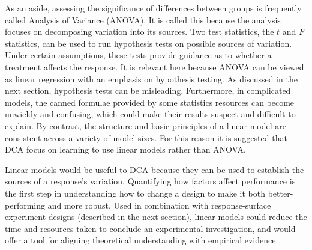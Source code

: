\documentclass[11pt,a4paper,article]{memoir} %
\begin{document}
As an aside, assessing the significance of differences between groups is frequently called Analysis of Variance (ANOVA). It is called this because the analysis focuses on decomposing variation into its sources. Two test statistics, the $t$ and $F$ statistics, can be used to run hypothesis tests on possible sources of variation. Under certain assumptions, these tests provide guidance as to whether a treatment affects the response. It is relevant here because ANOVA can be viewed as linear regression with an emphasis on hypothesis testing. As discussed in the next section, hypothesis tests can be misleading. Furthermore, in complicated models, the canned formulae provided by some statistics resources can become unwieldy and confusing, which could make their results suspect and difficult to explain. By contrast, the structure and basic principles of a linear model are consistent across a variety of model sizes. For this reason it is suggested that DCA focus on learning to use linear models rather than ANOVA.

Linear models would be useful to DCA because they can be used to establish the sources of a response's variation. Quantifying how factors affect performance is the first step in understanding how to change a design to make it both better-performing and more robust. Used in combination with response-surface experiment designs (described in the next section), linear models could reduce the time and resources taken to conclude an experimental investigation, and would offer a tool for aligning theoretical understanding with empirical evidence.

\newpage
\end{document}

